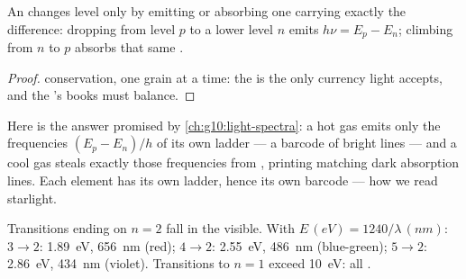 \begin{theorem}\label{thm:g12:quantum-world:transition}
An  changes level only by emitting or absorbing one  carrying
exactly the difference: dropping from level $p$ to a lower level $n$ emits
$h\nu = E_p - E_n$; climbing from $n$ to $p$ absorbs that same .
\end{theorem}

\begin{proof}
 conservation, one grain at a time: the  is the only currency
light accepts, and the 's books must balance.
\end{proof}

\begin{remark}\label{rem:g12:quantum-world:lines}
Here is the answer promised by \cref{ch:g10:light-spectra}: a hot gas emits
only the frequencies $(E_p - E_n)/h$ of its own ladder --- a barcode of
bright lines --- and a cool gas steals exactly those frequencies from , printing matching dark absorption lines. Each element has its own
ladder, hence its own barcode --- how we read starlight.
\end{remark}

\begin{example}\label{ex:g12:quantum-world:balmer}
Transitions ending on $n = 2$ fall in the visible. With $E \,(\unit{eV}) =
1240/\lambda\,(\unit{nm})$: $3 \to 2$: \qty{1.89}{eV}, \qty{656}{nm} (red);
$4 \to 2$: \qty{2.55}{eV}, \qty{486}{nm} (blue-green); $5 \to 2$:
\qty{2.86}{eV}, \qty{434}{nm} (violet). Transitions to $n = 1$ exceed
\qty{10}{eV}: all .
\end{example}

